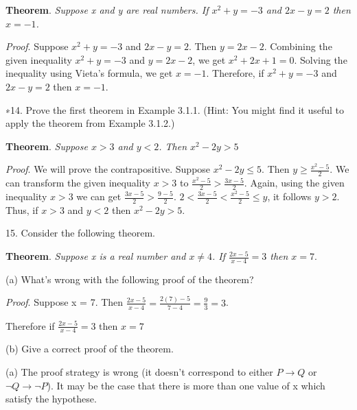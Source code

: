\documentclass{article}
\begin{document}
\textbf{Theorem}. \textit{Suppose x and y are real numbers. If $x^2 + y = -3$ and $2x - y = 2$ then $x = -1$.}

\textit{Proof}. Suppose $x^2 + y = -3$ and $2x - y = 2$. Then $y = 2x - 2$.
Combining the given inequality $x^2 + y = -3$ and $y = 2x - 2$, we get $x^2 + 2x + 1 = 0$.
Solving the inequality using Vieta's formula, we get $x = -1$. Therefore, if $x^2 + y = -3$ and $2x - y = 2$ then $x = -1$.

\vspace{30pt}

∗14. Prove the first theorem in Example 3.1.1. (Hint: You might find it useful to apply the theorem from Example 3.1.2.)

\vspace{20pt}

\textbf{Theorem}. \textit{Suppose $x > 3$ and $y < 2$. Then $x^2 - 2y > 5$}

\textit{Proof}. We will prove the contrapositive. Suppose $x^2 - 2y \leq 5$.
Then $y \geq \frac{x^2 - 5}{2}$. We can transform the given inequality $x > 3$ to $\frac{x^2 - 5}{2} > \frac{3x - 5}{2}$.
Again, using the given inequality $x > 3$ we can get $\frac{3x - 5}{2} > \frac{9 - 5}{2}$.
$2 < \frac{3x - 5}{2} < \frac{x^2 - 5}{2} \leq y$, it follows $y > 2$.
Thus, if $x > 3$ and $y < 2$ then $x^2 - 2y > 5$.

\vspace{30pt}

15. Consider the following theorem.

\textbf{Theorem}. \textit{Suppose x is a real number and $x \neq 4$. If $\frac{2x-5}{x-4} = 3$ then $x = 7$}.

\hspace{12pt}(a) What’s wrong with the following proof of the theorem?

\textit{Proof}. Suppose x = 7. Then $\frac{2x-5}{x-4} = \frac{2(7)-5}{7-4}=\frac{9}{3}=3$.

Therefore if $\frac{2x-5}{x-4} = 3$ then $x = 7$


\hspace{12pt}(b) Give a correct proof of the theorem.

\vspace{20pt}

(a) The proof strategy is wrong (it doesn't correspond to either $P \to Q$ or $\neg Q \to \neg P$). It may be the case that there is more than one value of x which satisfy the hypothese.

\vspace{20pt}
\end{document}
